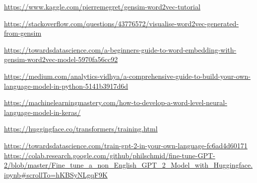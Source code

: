 \documentclass[a4paper]{article}
\begin{document}
\begin{thebibliography}{9}
\begin{LTRbibitems}

\resetlatinfont
{}
\url{https://www.kaggle.com/pierremegret/gensim-word2vec-tutorial}


\url{https://stackoverflow.com/questions/43776572/visualise-word2vec-generated-from-gensim}

\url{https://towardsdatascience.com/a-beginners-guide-to-word-embedding-with-gensim-word2vec-model-5970fa56cc92}

\url{https://medium.com/analytics-vidhya/a-comprehensive-guide-to-build-your-own-language-model-in-python-5141b3917d6d}


\url{https://machinelearningmastery.com/how-to-develop-a-word-level-neural-language-model-in-keras/}

\url{https://huggingface.co/transformers/training.html}

\url{https://towardsdatascience.com/train-gpt-2-in-your-own-language-fc6ad4d60171
https://colab.research.google.com/github/philschmid/fine-tune-GPT-2/blob/master/Fine_tune_a_non_English_GPT_2_Model_with_Huggingface.ipynb#scrollTo=hKBSyNLgqF9K}
\end{LTRbibitems}
\end{thebibliography}
\end{document}
